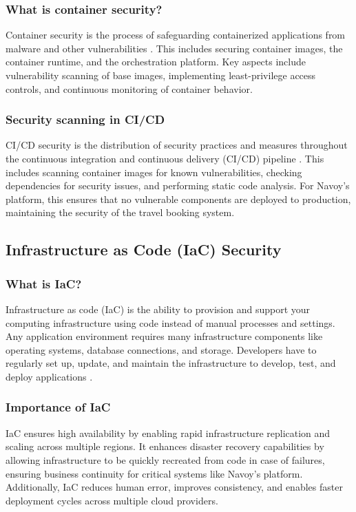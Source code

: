 \subsubsection*{What is container security?}
Container security is the process of safeguarding containerized applications from malware and other vulnerabilities \cite{redhat-container-security}. This includes securing container images, the container runtime, and the orchestration platform. Key aspects include vulnerability scanning of base images, implementing least-privilege access controls, and continuous monitoring of container behavior.

\subsubsection*{Security scanning in CI/CD}
CI/CD security is the distribution of security practices and measures throughout the continuous integration and continuous delivery (CI/CD) pipeline \cite{paloalto-cicd-security}. This includes scanning container images for known vulnerabilities, checking dependencies for security issues, and performing static code analysis. For Navoy's platform, this ensures that no vulnerable components are deployed to production, maintaining the security of the travel booking system.

\subsection{Infrastructure as Code (IaC) Security}

\subsubsection*{What is IaC?}
Infrastructure as code (IaC) is the ability to provision and support your computing infrastructure using code instead of manual processes and settings. Any application environment requires many infrastructure components like operating systems, database connections, and storage. Developers have to regularly set up, update, and maintain the infrastructure to develop, test, and deploy applications \cite{aws-iac}.

\subsubsection*{Importance of IaC}
IaC ensures high availability by enabling rapid infrastructure replication and scaling across multiple regions. It enhances disaster recovery capabilities by allowing infrastructure to be quickly recreated from code in case of failures, ensuring business continuity for critical systems like Navoy's platform. Additionally, IaC reduces human error, improves consistency, and enables faster deployment cycles across multiple cloud providers.

